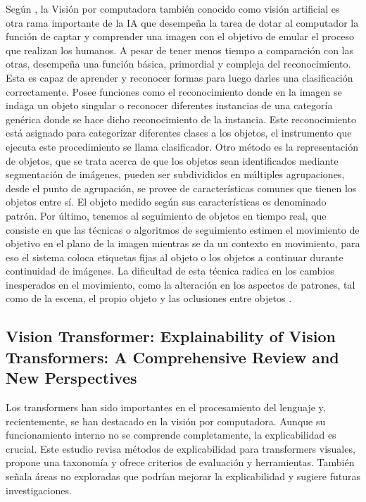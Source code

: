  Según \cite{alonso2016vision}, la Visión por computadora también conocido como visión artificial es otra rama importante de la IA que desempeña la tarea de dotar al computador la función de captar y comprender una imagen con el objetivo de emular el proceso que realizan los humanos. A pesar de tener menos tiempo a comparación con las otras, desempeña una función básica, primordial y compleja del reconocimiento. Esta es capaz de aprender y reconocer formas para luego darles una clasificación correctamente.
 Posee funciones como el reconocimiento donde en la imagen se indaga un objeto singular o reconocer diferentes instancias de una categoría genérica donde se hace dicho reconocimiento de la instancia. Este reconocimiento está asignado para categorizar diferentes clases a los objetos, el instrumento que ejecuta este procedimiento se llama clasificador.  Otro método es la representación de objetos, que se trata acerca de que los objetos sean identificados mediante segmentación de imágenes, pueden ser subdivididos en múltiples agrupaciones, desde el punto de agrupación, se provee de características comunes que tienen los objetos entre sí. El objeto medido según sus características es denominado patrón. Por último, tenemos al seguimiento de objetos en tiempo real, que consiste en que las técnicas o algoritmos de seguimiento estimen el movimiento de objetivo en el plano de la imagen mientras se da un contexto en movimiento, para eso el sistema coloca etiquetas fijas al objeto o los objetos a continuar durante continuidad de imágenes. La dificultad de esta técnica radica en los cambios inesperados en el movimiento, como la alteración en los aspectos de patrones, tal como de la escena, el propio objeto y las oclusiones entre objetos \parencite{alonso2016vision}.
 
 \subsection{Vision Transformer: Explainability of Vision Transformers: A Comprehensive Review and New Perspectives \citep*{tecnica1}}
 Los transformers han sido importantes en el procesamiento del lenguaje y, recientemente, se han destacado en la visión por computadora. Aunque su funcionamiento interno no se comprende completamente, la explicabilidad es crucial. Este estudio revisa métodos de explicabilidad para transformers visuales, propone una taxonomía y ofrece criterios de evaluación y herramientas. También señala áreas no exploradas que podrían mejorar la explicabilidad y sugiere futuras investigaciones.
 
